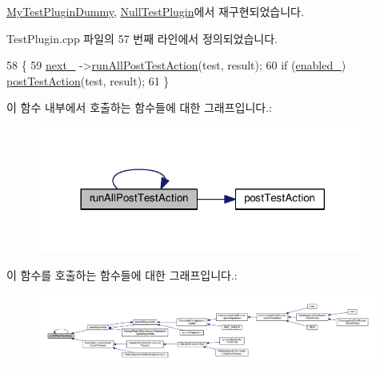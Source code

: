 \hyperlink{class_my_test_plugin_dummy_a54dd648a419c40a0cb4dc437cf212f87}{My\+Test\+Plugin\+Dummy}, \hyperlink{class_null_test_plugin_ac05bc48cf47192517888cb6dbe38897d}{Null\+Test\+Plugin}에서 재구현되었습니다.



Test\+Plugin.\+cpp 파일의 57 번째 라인에서 정의되었습니다.


\begin{DoxyCode}
58 \{
59     \hyperlink{class_test_plugin_a9461650e936ee3765377081fb8bc15dc}{next\_} ->\hyperlink{class_test_plugin_ac6e93f69beb5b43b8cedf17a77ccc6b1}{runAllPostTestAction}(test, result);
60     \textcolor{keywordflow}{if} (\hyperlink{class_test_plugin_ab6dfcb3e6c79f4def1295fea7f0de8c0}{enabled\_}) \hyperlink{class_test_plugin_a4d9ea193c7b8e3eb8b50f985f688e4a8}{postTestAction}(test, result);
61 \}
\end{DoxyCode}


이 함수 내부에서 호출하는 함수들에 대한 그래프입니다.\+:
\nopagebreak
\begin{figure}[H]
\begin{center}
\leavevmode
\includegraphics[width=308pt]{class_test_plugin_ac6e93f69beb5b43b8cedf17a77ccc6b1_cgraph}
\end{center}
\end{figure}




이 함수를 호출하는 함수들에 대한 그래프입니다.\+:
\nopagebreak
\begin{figure}[H]
\begin{center}
\leavevmode
\includegraphics[width=350pt]{class_test_plugin_ac6e93f69beb5b43b8cedf17a77ccc6b1_icgraph}
\end{center}
\end{figure}


